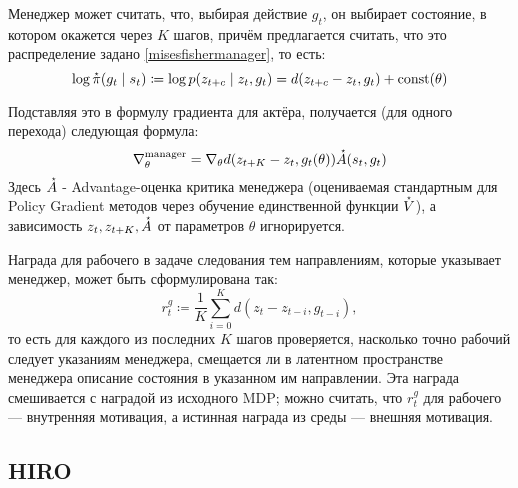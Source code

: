 Менеджер может считать, что, выбирая действие $g_t$, он выбирает состояние, в котором окажется через $K$ шагов, причём предлагается считать, что это распределение задано \eqref{misesfishermanager}, то есть:
$$\log \accentset{\star}{\pi}(g_t \mid s_t) \coloneqq \log p(z_{t + c} \mid z_t, g_t) = d(z_{t+c} - z_t, g_t) + \operatorname{const}(\theta)$$

Подставляя это в формулу градиента для актёра, получается (для одного перехода) следующая формула:
$$\nabla_{\theta}^{\mathrm{manager}} = \nabla_{\theta} d(z_{t+K} - z_t, g_t(\theta)) \accentset{\star}{A}(s_t, g_t)$$
Здесь $\accentset{\star}{A}$ - Advantage-оценка критика менеджера (оцениваемая стандартным для Policy Gradient методов через обучение единственной функции $\accentset{\star}{V}$), а зависимость $z_t, z_{t+K}, \accentset{\star}{A}$ от параметров $\theta$ игнорируется.


Награда для рабочего в задаче следования тем направлениям, которые указывает менеджер, может быть сформулирована так:
$$r^{g}_t \coloneqq \frac{1}{K}\sum_{i = 0}^{K} d(z_t - z_{t - i}, g_{t - i}),$$
то есть для каждого из последних $K$ шагов проверяется, насколько точно рабочий следует указаниям менеджера, смещается ли в латентном пространстве менеджера описание состояния в указанном им направлении. Эта награда смешивается с наградой из исходного MDP; можно считать, что $r^{g}_t$ для рабочего --- внутренняя мотивация, а истинная награда из среды --- внешняя мотивация.

\subsection{HIRO}

